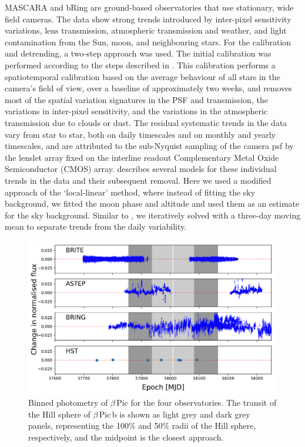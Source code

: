 \documentclass[longauth]{aa} %
\newcommand{\bpb}{$\beta$\,Pic\,b}
\newcommand{\bp}{$\beta$\,Pic}
\begin{document}
MASCARA and bRing are ground-based observatories that use stationary, wide field cameras.
%
The data show strong trends introduced by inter-pixel sensitivity variations, lens transmission, atmospheric transmission and weather, and light contamination from the Sun, moon, and neighbouring stars.
%
For the calibration and detrending, a two-step approach was used.
%
The initial calibration was performed according to the steps described in \citet{talens2018}.
%
This calibration performs a spatiotemporal calibration based on the average behaviour of all stars in the camera's field of view, over a baseline of approximately two weeks, and removes most of the spatial variation signatures in the PSF and transmission, the variations in inter-pixel sensitivity, and the variations in the atmospheric transmission due to clouds or dust.
%
The residual systematic trends in the data vary from star to star, both on daily timescales and on monthly and yearly timescales, and are attributed to the sub-Nyquist sampling of the camera \ac{psf} by the lenslet array fixed on the interline readout Complementary Metal Oxide Semiconductor (CMOS) array.
%
\citet{talens2018} describes several models for these individual trends in the data and their subsequent removal.
%
Here we used a modified approach of the `local-linear' method, where instead of fitting the sky background, we fitted the moon phase and altitude and used them as an estimate for the sky background.
%
Similar to \cite{talens2018}, we iteratively solved with a three-day moving mean to separate trends from the daily variability.
%


\begin{figure}[htb]
\centering
\includegraphics[width=1.0\textwidth]{all_binned_photometry.pdf}
\caption{Binned photometry of \bp{} for the four observatories. The transit of the Hill sphere of \bpb{} is shown as light grey and dark grey panels, representing the 100\% and 50\% radii of the Hill sphere, respectively, and the midpoint is the closest approach.}
\label{fig:binnedphot}
\end{figure}
\end{document}
